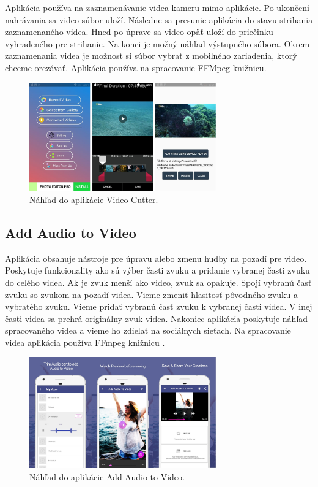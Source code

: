 \documentclass[12pt, oneside]{book}
\begin{document}
Aplikácia používa na zaznamenávanie videa kameru mimo aplikácie. Po ukončení nahrávania sa video súbor uloží. Následne sa presunie aplikácia do stavu strihania zaznamenaného videa. Hneď po úprave sa video opäť uloží do priečinku vyhradeného pre strihanie. Na konci je možný náhľad výstupného súbora. Okrem zaznamenania videa je možnosť si súbor vybrať z mobilného zariadenia, ktorý chceme orezávať. Aplikácia používa na spracovanie FFMpeg knižnicu.

\begin{figure}[h]
    \centering
    \includegraphics[width=0.72\textwidth]{images/aplikacia2.jpg}
    \caption{Náhľad do aplikácie Video Cutter.}
    \label{fig:obr03}
\end{figure}

\subsection{Add Audio to Video}

\hspace{15pt} Aplikácia obsahuje nástroje pre úpravu alebo zmenu hudby na pozadí pre video. Poskytuje funkcionality ako sú výber časti zvuku a pridanie vybranej časti zvuku do celého videa. Ak je zvuk menší ako video, zvuk sa opakuje. Spojí vybranú časť zvuku so zvukom na pozadí videa. Vieme zmeniť hlasitosť pôvodného zvuku a vybratého zvuku. Vieme pridať vybranú časť zvuku k vybranej časti videa. V inej časti videa sa prehrá originálny zvuk videa. Nakoniec aplikácia poskytuje náhľad spracovaného videa a vieme ho zdielať na sociálnych sieťach. Na spracovanie videa aplikácia používa FFmpeg knižnicu \citep{aplikacia3}.

\begin{figure}[h]
    \centering
    \includegraphics[width=0.72\textwidth]{images/aplikacia3.jpg}
    \caption{Náhľad do aplikácie Add Audio to Video.}
    \label{fig:obr04}
\end{figure}
\end{document}
